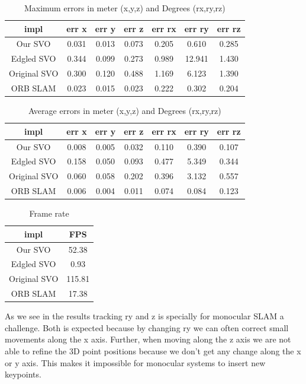 \documentclass[11pt,a4paper,titlepage,oneside]{report}
\begin{document}
\begin{table}[H]
  \centering
  \begin{tabular}{|c|c|c|c|c|c|c|}
    impl & err x & err y & err z & err rx & err ry & err rz\\
    \hline
    Our SVO & 0.031 & 0.013 & 0.073 & 0.205 & 0.610 & 0.285\\
    Edgled SVO & 0.344 & 0.099 & 0.273 & 0.989 & 12.941 & 1.430\\
    Original SVO & 0.300 & 0.120 & 0.488 & 1.169 & 6.123 & 1.390\\
    ORB SLAM& 0.023 & 0.015 & 0.023 & 0.222 & 0.302 & 0.204
  \end{tabular}
  \caption{Maximum errors in meter (x,y,z) and Degrees (rx,ry,rz)}
  \label{tab:maximas}
\end{table}

\begin{table}[H]
  \centering
  \begin{tabular}{|c|c|c|c|c|c|c|}
  impl & err x & err y & err z & err rx & err ry & err rz\\
  \hline
  Our SVO & 0.008 & 0.005 & 0.032 & 0.110 & 0.390 & 0.107\\
  Edgled SVO & 0.158 & 0.050 & 0.093 & 0.477 & 5.349 & 0.344\\
  Original SVO & 0.060 & 0.058 & 0.202 & 0.396 & 3.132 & 0.557\\
  ORB SLAM & 0.006 & 0.004 & 0.011 & 0.074 & 0.084 & 0.123
\end{tabular}

\caption{Average errors in meter (x,y,z) and Degrees (rx,ry,rz)}
\label{tab:average}
\end{table}

\begin{table}[H]
  \centering
  \begin{tabular}{|c|c|}
  impl & FPS\\
  \hline
  Our SVO & 52.38\\
  Edgled SVO & 0.93\\
  Original SVO & 115.81\\
  ORB SLAM & 17.38
\end{tabular}
\caption{Frame rate}
\label{tab:fps}
\end{table}

As we see in the results tracking ry and z is specially for monocular SLAM a challenge. Both is expected because by changing ry we can often correct small movements along the x axis. Further, when moving along the z axis we are not able to refine the 3D point positions because we don't get any change along the x or y axis. This makes it impossible for monocular systems to insert new keypoints.
\end{document}
